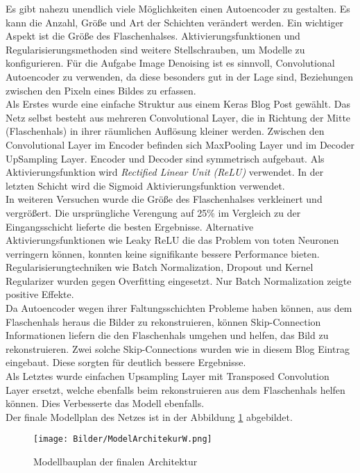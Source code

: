 \documentclass[conference]{IEEEtran}
\begin{document}
Es gibt nahezu unendlich viele Möglichkeiten einen Autoencoder zu gestalten. Es kann die Anzahl, Größe und Art der Schichten verändert werden. Ein wichtiger Aspekt ist die Größe des Flaschenhalses. Aktivierungsfunktionen und Regularisierungsmethoden sind weitere Stellschrauben, um Modelle zu konfigurieren. Für die Aufgabe Image Denoising ist es sinnvoll, Convolutional Autoencoder zu verwenden, da diese besonders gut in der Lage sind, Beziehungen zwischen den Pixeln eines Bildes zu erfassen\cite{3}.\\
Als Erstes wurde eine einfache Struktur aus einem Keras Blog Post gewählt\cite{1}. Das Netz selbst besteht aus mehreren Convolutional Layer, die in Richtung der Mitte (Flaschenhals) in ihrer räumlichen Auflösung kleiner werden. Zwischen den Convolutional Layer im Encoder befinden sich MaxPooling Layer und im Decoder UpSampling Layer. Encoder und Decoder sind symmetrisch aufgebaut. Als Aktivierungsfunktion wird \textit{Rectified Linear Unit (ReLU)} verwendet. In der letzten Schicht wird die Sigmoid Aktivierungsfunktion verwendet.\\
In weiteren Versuchen wurde die Größe des Flaschenhalses verkleinert und vergrößert. Die ursprüngliche Verengung auf 25\% im Vergleich zu der Eingangsschicht lieferte die besten Ergebnisse. Alternative Aktivierungsfunktionen wie Leaky ReLU die das Problem von toten Neuronen verringern können, konnten keine signifikante bessere Performance bieten.\\
Regularisierungtechniken wie Batch Normalization, Dropout und Kernel Regularizer wurden gegen Overfitting eingesetzt. Nur Batch Normalization zeigte positive Effekte.\\
Da Autoencoder wegen ihrer Faltungsschichten Probleme haben können, aus dem Flaschenhals heraus die Bilder zu rekonstruieren, können Skip-Connection Informationen liefern die den Flaschenhals umgehen und helfen, das Bild zu rekonstruieren\cite{degrad}. Zwei solche Skip-Connections wurden wie in diesem Blog Eintrag \cite{Skip} eingebaut. Diese sorgten für deutlich bessere Ergebnisse.\\
Als Letztes wurde einfachen Upsampling Layer mit Transposed Convolution Layer ersetzt, welche ebenfalls beim rekonstruieren aus dem Flaschenhals helfen können. Dies Verbesserte das Modell ebenfalls.\\
Der finale Modellplan des Netzes ist in der Abbildung \ref{Architektur} abgebildet.
\begin{figure}[h]
	\begin{center}
		\texttt{[image: Bilder/ModelArchitekurW.png]}
		\caption{Modellbauplan der finalen Architektur}
	\label{Architektur}
	\end{center}
\end{figure}
\end{document}
